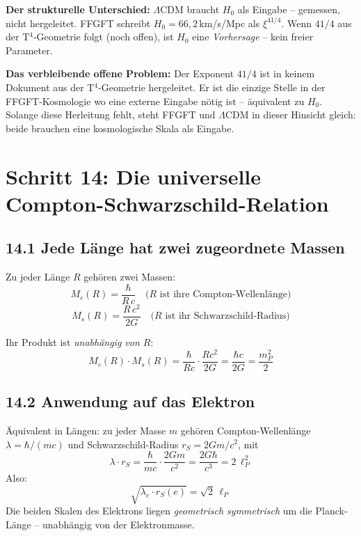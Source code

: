 \textbf{Der strukturelle Unterschied:}
$\Lambda$CDM braucht $H_0$ als Eingabe -- gemessen, nicht hergeleitet.
FFGFT schreibt $H_0 = 66{,}2$\,km/s/Mpc als $\xi^{41/4}$.
Wenn $41/4$ aus der T$^4$-Geometrie folgt (noch offen),
ist $H_0$ eine \emph{Vorhersage} -- kein freier Parameter.

\textbf{Das verbleibende offene Problem:}
Der Exponent $41/4$ ist in keinem Dokument aus der T$^4$-Geometrie
hergeleitet. Er ist die einzige Stelle in der FFGFT-Kosmologie
wo eine externe Eingabe nötig ist -- äquivalent zu $H_0$.
Solange diese Herleitung fehlt, steht FFGFT und $\Lambda$CDM
in dieser Hinsicht gleich: beide brauchen eine kosmologische
Skala als Eingabe.

\section{Schritt 14: Die universelle Compton-Schwarzschild-Relation}

\subsection*{14.1 Jede Länge hat zwei zugeordnete Massen}

Zu jeder Länge $R$ gehören zwei Massen:
\[
  M_c(R) = \frac{\hbar}{R\,c}
  \quad\text{(}R\text{ ist ihre Compton-Wellenlänge)}
\]
\[
  M_s(R) = \frac{R\,c^2}{2G}
  \quad\text{(}R\text{ ist ihr Schwarzschild-Radius)}
\]

Ihr Produkt ist \emph{unabhängig von $R$}:
\[
  \boxed{M_c(R)\cdot M_s(R)
  = \frac{\hbar}{Rc}\cdot\frac{Rc^2}{2G}
  = \frac{\hbar c}{2G}
  = \frac{m_P^2}{2}}
\]

\subsection*{14.2 Anwendung auf das Elektron}

Äquivalent in Längen: zu jeder Masse $m$ gehören Compton-Wellenlänge
$\lambda = \hbar/(mc)$ und Schwarzschild-Radius $r_S = 2Gm/c^2$, mit
\[
  \lambda \cdot r_S = \frac{\hbar}{mc}\cdot\frac{2Gm}{c^2}
  = \frac{2G\hbar}{c^3} = 2\,\ell_P^2
\]
Also:
\[
  \sqrt{\lambda_e \cdot r_S(e)} = \sqrt{2}\,\ell_P
\]
Die beiden Skalen des Elektrons liegen \emph{geometrisch symmetrisch}
um die Planck-Länge -- unabhängig von der Elektronmasse.


